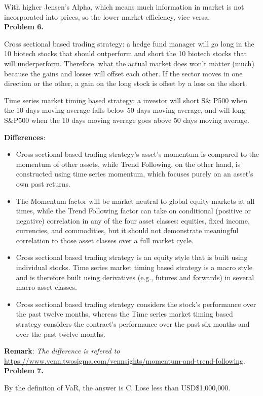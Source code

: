 \documentclass[12pt,a4paper]{article}
\begin{document}
With higher Jensen's Alpha, which means much information in market is not incorporated into prices, so the lower market efficiency, vice versa.
\\

\textbf{Problem 6.}

Cross sectional based trading strategy: a hedge fund manager will go long in the 10 biotech stocks that should outperform and short the 10 biotech stocks that will underperform. Therefore, what the actual market does won't matter (much) because the gains and losses will offset each other. If the sector moves in one direction or the other, a gain on the long stock is offset by a loss on the short.

Time series market timing based strategy: a investor will short S\& P500 when the 10 days moving average falls below 50 days moving average, and will long S\&P500 when the 10 days moving average goes above 50 days moving average.

\textbf{Differences}:
\begin{itemize}
    \item Cross sectional based trading strategy's asset's momentum is compared to the momentum of other assets, while Trend Following, on the other hand, is constructed using time series momentum, which focuses purely on an asset’s own past returns.
    \item The Momentum factor will be market neutral to global equity markets at all times, while the Trend Following factor can take on conditional (positive or negative) correlation in any of the four asset classes: equities, fixed income, currencies, and commodities, but it should not demonstrate meaningful correlation to those asset classes over a full market cycle.
    \item Cross sectional based trading strategy is an equity style that is built using individual stocks. Time series market timing based strategy is a macro style and is therefore built using derivatives (e.g., futures and forwards) in several macro asset classes.
    \item Cross sectional based trading strategy considers the stock’s performance over the past twelve months, whereas the Time series market timing based strategy considers the contract’s performance over the past six months and over the past twelve months.
\end{itemize}

\textbf{Remark}: \emph{The difference is refered to} \href{https://www.venn.twosigma.com/vennsights/momentum-and-trend-following}{https://www.venn.twosigma.com/vennsights/momentum-and-trend-following}.
\\

\textbf{Problem 7.}

By the definiton of VaR, the answer is C. Lose less than USD\$1,000,000.
\end{document}
